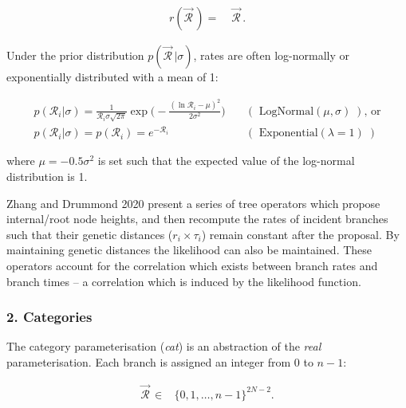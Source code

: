 \documentclass[10pt,letterpaper]{article}
\begin{document}
\begin{align}
r(\vec{\mathcal{R}}^{\,}) =& \; \vec{\mathcal{R}}^{\,}.
\end{align}


Under the prior distribution $p(\vec{\mathcal{R}}^{\,} | \sigma)$, rates are often log-normally or exponentially distributed with a mean of 1:

\begin{align}
p(\mathcal{R}_i | \sigma) = \frac{1}{\mathcal{R}_i \sigma \sqrt{2\pi}} \exp \big( -\frac{(\ln \mathcal{R}_i - \mu)^2}{2\sigma^2} \big) \quad &(\text{ LogNormal}(\mu, \sigma)\;) \text{, or}  \\
p(\mathcal{R}_i | \sigma) = p(\mathcal{R}_i) = e^{-\mathcal{R}_i} \quad &(\text{ Exponential}(\lambda=1)\;)
\end{align}


where $\mu = -0.5\sigma^2$ is set such that the expected value of the log-normal distribution is 1.


Zhang and Drummond 2020 present a series of tree operators which propose internal/root node heights, and then recompute the rates of incident branches such that their genetic distances ($r_i \times \tau_i$) remain constant after the proposal. By maintaining genetic distances the likelihood can also be maintained. These operators account for the correlation which exists between branch rates and branch times -- a correlation which is induced by the likelihood function.





\subsubsection*{2. Categories}
The category parameterisation (\textit{cat}) is an abstraction of the \textit{real} parameterisation. Each branch is assigned an integer from $0$ to $n-1$:

\begin{align}
\vec{\mathcal{R}}^{\,} \in& \{ 0, 1, \dotso, n-1 \}^{2N-2}.
\end{align}
\end{document}
